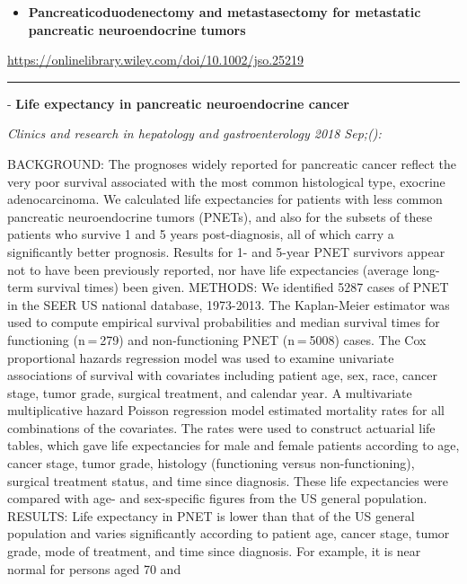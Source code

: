 \documentclass[]{article}
\providecommand{\tightlist}{%
  \setlength{\itemsep}{0pt}\setlength{\parskip}{0pt}}
\begin{document}
\begin{itemize}
\tightlist
\item
  \textbf{Pancreaticoduodenectomy and metastasectomy for metastatic
  pancreatic neuroendocrine tumors}
\end{itemize}

\url{https://onlinelibrary.wiley.com/doi/10.1002/jso.25219}

\begin{center}\rule{0.5\linewidth}{\linethickness}\end{center}

 - \textbf{Life expectancy in pancreatic neuroendocrine cancer}

\emph{Clinics and research in hepatology and gastroenterology 2018
Sep;():}

BACKGROUND: The prognoses widely reported for pancreatic cancer reflect
the very poor survival associated with the most common histological
type, exocrine adenocarcinoma. We calculated life expectancies for
patients with less common pancreatic neuroendocrine tumors (PNETs), and
also for the subsets of these patients who survive 1 and 5 years
post-diagnosis, all of which carry a significantly better prognosis.
Results for 1- and 5-year PNET survivors appear not to have been
previously reported, nor have life expectancies (average long-term
survival times) been given. METHODS: We identified 5287 cases of PNET in
the SEER US national database, 1973-2013. The Kaplan-Meier estimator was
used to compute empirical survival probabilities and median survival
times for functioning (n = 279) and non-functioning PNET (n = 5008)
cases. The Cox proportional hazards regression model was used to examine
univariate associations of survival with covariates including patient
age, sex, race, cancer stage, tumor grade, surgical treatment, and
calendar year. A multivariate multiplicative hazard Poisson regression
model estimated mortality rates for all combinations of the covariates.
The rates were used to construct actuarial life tables, which gave life
expectancies for male and female patients according to age, cancer
stage, tumor grade, histology (functioning versus non-functioning),
surgical treatment status, and time since diagnosis. These life
expectancies were compared with age- and sex-specific figures from the
US general population. RESULTS: Life expectancy in PNET is lower than
that of the US general population and varies significantly according to
patient age, cancer stage, tumor grade, mode of treatment, and time
since diagnosis. For example, it is near normal for persons aged 70 and
\end{document}

